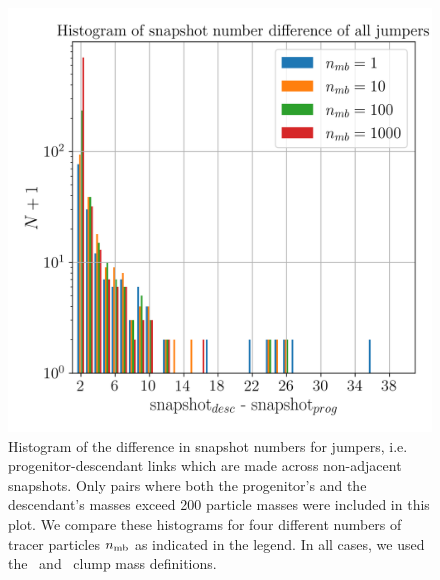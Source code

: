 \begin{figure}
  \centering
  \includegraphics[width=.9\linewidth, keepaspectratio]{images/tree-statistics-my-threshold/jumper_distance-ntrace.png}%
  \caption{ Histogram of the difference in snapshot numbers for
    jumpers, i.e.  progenitor-descendant links which are made across
    non-adjacent snapshots.  Only pairs where both the progenitor's
    and the descendant's masses exceed 200 particle masses were
    included in this plot.  We compare these histograms for four
    different numbers of tracer particles $n_{\rm mb}$ as indicated in
    the legend.  In all cases, we used the \exc\ and \sad\ clump mass
    definitions.
  }%
  \label{fig:jumper-distances}
\end{figure}

